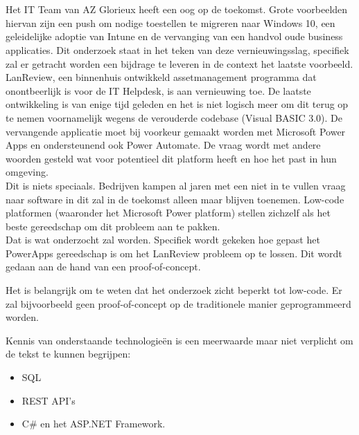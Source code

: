 
\chapter{}
\label{ch:inleiding}

Het IT Team van AZ Glorieux heeft een oog op de toekomst. Grote voorbeelden hiervan zijn een push om nodige toestellen te migreren naar Windows 10, een geleidelijke adoptie van Intune en de vervanging van een handvol oude business applicaties. Dit onderzoek staat in het teken van deze vernieuwingsslag, specifiek zal er getracht worden een bijdrage te leveren in de context het laatste voorbeeld.\\
LanReview, een binnenhuis ontwikkeld assetmanagement programma dat onontbeerlijk is voor de IT Helpdesk, is aan vernieuwing toe. De laatste ontwikkeling is van enige tijd geleden en het is niet logisch meer om dit terug op te nemen voornamelijk wegens de verouderde codebase (Visual BASIC 3.0). De vervangende applicatie moet bij voorkeur gemaakt worden met Microsoft Power Apps en ondersteunend ook Power Automate. De vraag wordt met andere woorden gesteld wat voor potentieel dit platform heeft en hoe het past in hun omgeving.\\
Dit is niets speciaals. Bedrijven kampen al jaren met een niet in te vullen vraag naar software in dit zal in de toekomst alleen maar blijven toenemen. Low-code platformen (waaronder het Microsoft Power platform) stellen zichzelf als het beste gereedschap om dit probleem aan te pakken.\\
Dat is wat onderzocht zal worden. Specifiek wordt gekeken hoe gepast het PowerApps gereedschap is om het LanReview probleem op te lossen. Dit wordt gedaan aan de hand van een proof-of-concept.

Het is belangrijk om te weten dat het onderzoek zicht beperkt tot low-code. Er zal bijvoorbeeld geen proof-of-concept op de traditionele manier geprogrammeerd worden.

Kennis van onderstaande technologieën is een meerwaarde maar niet verplicht om de tekst te kunnen begrijpen:
\begin{itemize}
    \item SQL
    \item REST API's
    \item C\# en het ASP.NET Framework.
\end{itemize}

